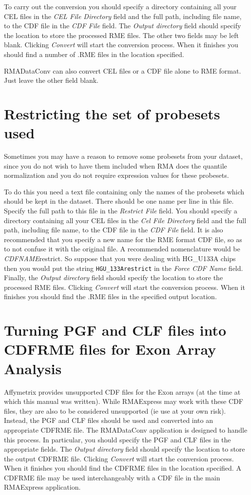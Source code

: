 \documentclass[11pt]{report}
\begin{document}
To carry out the conversion you should specify a directory containing all your CEL files in the {\it CEL File Directory} field and the full path, including file name, to the CDF file in the {\it CDF File} field. The {\it Output directory} field should specify the location to store the processed RME files. The other two fields may be left blank. Clicking {\it Convert} will start the conversion process. When it finishes you should find a number of .RME files in the location specified. 

RMADataConv can also convert CEL files or a CDF file alone to RME format. Just leave the other field blank.

\section{Restricting the set of probesets used}

Sometimes you may have a reason to remove some probesets from your dataset, since you do not wish to have them included when RMA does the quantile normalization and you do not require expression values for these probesets. 

To do this you need a text file containing only the names of the probesets which should be kept in the dataset. There should be one name per line in this file. Specify the full path to this file in the {\it Restrict File} field. You should  specify a directory containing all your CEL files in the {\it Cel File Directory} field and the full path, including file name, to the CDF file in the {\it CDF File} field. It is also recommended that you specify a new name for the RME format CDF file, so as to not confuse it with the original file. A recommended nomenclature would be {\it CDFNAME}restrict. So suppose that you were dealing with HG\_U133A chips then you would put the string {\tt HGU\_133Arestrict} in the  {\it Force CDF Name} field. Finally, the {\it Output directory} field should specify the location to store the processed RME files.  Clicking {\it Convert} will start the conversion process. When it finishes you should find the .RME files in the specified output location. 

\section{Turning PGF and CLF files into CDFRME files for Exon Array Analysis}

Affymetrix provides unsupported CDF files for the Exon arrays (at the time at which this manual was written). While RMAExpress may work with these CDF files, they are also to be considered unsupported (ie use at your own risk). Instead, the PGF and CLF files should be used and converted into an appropriate CDFRME file. The RMADataConv application is designed to handle this process. In particular, you should specify the PGF and CLF files in the appropriate fields. The {\it Output directory} field should specify the location to store the output CDFRME file. Clicking {\it Convert} will start the conversion process. When it finishes you should find the CDFRME files in the location specified. A CDFRME file may be used interchangeably with a CDF file in the main RMAExpress application.
\end{document}
